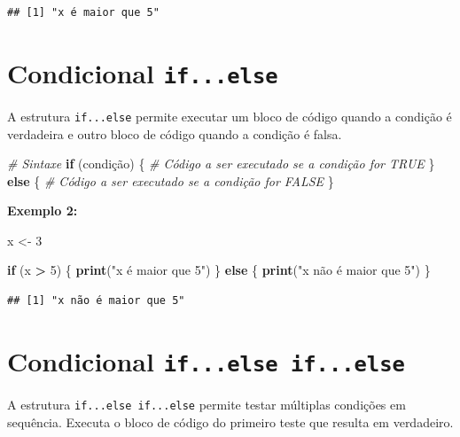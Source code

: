 \documentclass[
]{book}
\newenvironment{Shaded}{\begin{snugshade}}{\end{snugshade}}
\newcommand{\CommentTok}[1]{\textcolor[rgb]{0.56,0.35,0.01}{\textit{#1}}}
\newcommand{\ControlFlowTok}[1]{\textcolor[rgb]{0.13,0.29,0.53}{\textbf{#1}}}
\newcommand{\DecValTok}[1]{\textcolor[rgb]{0.00,0.00,0.81}{#1}}
\newcommand{\FunctionTok}[1]{\textcolor[rgb]{0.13,0.29,0.53}{\textbf{#1}}}
\newcommand{\NormalTok}[1]{#1}
\newcommand{\OtherTok}[1]{\textcolor[rgb]{0.56,0.35,0.01}{#1}}
\newcommand{\SpecialCharTok}[1]{\textcolor[rgb]{0.81,0.36,0.00}{\textbf{#1}}}
\newcommand{\StringTok}[1]{\textcolor[rgb]{0.31,0.60,0.02}{#1}}
\theoremstyle{definition}
\theoremstyle{definition}
\theoremstyle{definition}
\theoremstyle{definition}
\theoremstyle{remark}
\begin{document}
\begin{verbatim}
## [1] "x é maior que 5"
\end{verbatim}

\section{\texorpdfstring{Condicional \texttt{if...else}}{Condicional if...else}}\label{condicional-if...else}

A estrutura \texttt{if...else} permite executar um bloco de código quando a condição é verdadeira e outro bloco de código quando a condição é falsa.

\begin{Shaded}
\begin{Highlighting}[]
\CommentTok{\# Sintaxe}
\ControlFlowTok{if}\NormalTok{ (condição) \{}
      \CommentTok{\# Código a ser executado se a condição for TRUE}
\NormalTok{\} }\ControlFlowTok{else}\NormalTok{ \{}
      \CommentTok{\# Código a ser executado se a condição for FALSE}
\NormalTok{\}}
\end{Highlighting}
\end{Shaded}

\textbf{Exemplo 2:}

\begin{Shaded}
\begin{Highlighting}[]
\NormalTok{x }\OtherTok{\textless{}{-}} \DecValTok{3}

\ControlFlowTok{if}\NormalTok{ (x }\SpecialCharTok{\textgreater{}} \DecValTok{5}\NormalTok{) \{}
      \FunctionTok{print}\NormalTok{(}\StringTok{"x é maior que 5"}\NormalTok{)}
\NormalTok{\} }\ControlFlowTok{else}\NormalTok{ \{}
    \FunctionTok{print}\NormalTok{(}\StringTok{"x não é maior que 5"}\NormalTok{)}
\NormalTok{\}}
\end{Highlighting}
\end{Shaded}

\begin{verbatim}
## [1] "x não é maior que 5"
\end{verbatim}

\section{\texorpdfstring{Condicional \texttt{if...else\ if...else}}{Condicional if...else if...else}}\label{condicional-if...else-if...else}

A estrutura \texttt{if...else\ if...else} permite testar múltiplas condições em sequência. Executa o bloco de código do primeiro teste que resulta em verdadeiro.
\end{document}
